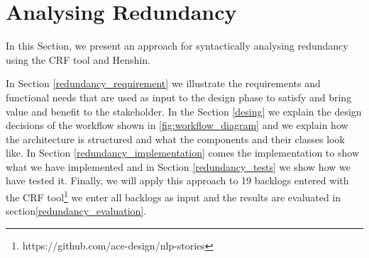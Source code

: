 \section{Analysing Redundancy}\label{redundancy}
In this Section, we present an approach for syntactically analysing redundancy using the CRF tool and Henshin.

In Section \ref{redundancy_requirement} we illustrate the requirements and functional needs that are used as input to the design phase to satisfy and bring value and benefit to the stakeholder. In the Section \ref{desing} we explain the design decisions of the workflow shown in \ref{fig:workflow_diagram} and we explain how the architecture is structured and what the components and their classes look like. In Section \ref{redundancy_implementation} comes the implementation to show what we have implemented and in Section \ref{redundancy_tests} we show how we have tested it. Finally, we will apply this approach to 19 backlogs entered with the CRF tool\footnote{https://github.com/ace-design/nlp-stories} we enter all backlogs as input and the results are evaluated in section\ref{redundancy_evaluation}.
